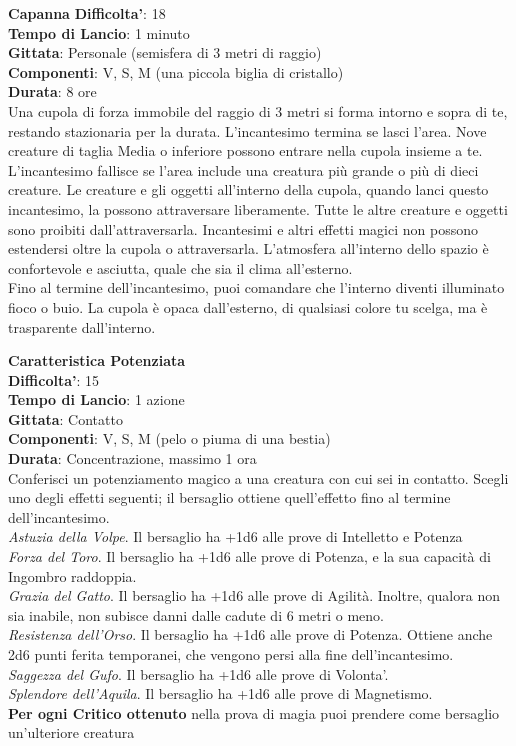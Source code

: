 \begin{multicols}{2}
\medskip\textbf{Capanna}
\textbf{Difficolta'}: 18\\
\textbf{Tempo di Lancio}: 1 minuto\\
\textbf{Gittata}: Personale (semisfera di 3 metri di raggio)\\
\textbf{Componenti}: V, S, M (una piccola biglia di cristallo)\\
\textbf{Durata}: 8 ore\\
Una cupola di forza immobile del raggio di 3 metri si forma intorno e sopra di te, restando stazionaria per la durata. L’incantesimo termina se lasci l’area. Nove creature di taglia Media o inferiore possono entrare nella cupola insieme a te. L’incantesimo fallisce se l’area include una creatura più grande o più di dieci creature. Le creature e gli oggetti all’interno della cupola, quando lanci questo incantesimo, la possono attraversare liberamente. Tutte le altre creature e oggetti sono proibiti dall’attraversarla. Incantesimi e altri effetti magici non possono estendersi oltre la cupola o attraversarla. L’atmosfera all’interno dello spazio è confortevole e asciutta, quale che sia il clima all’esterno.\\
Fino al termine dell’incantesimo, puoi comandare che l’interno diventi illuminato fioco o buio. La cupola è opaca dall’esterno, di qualsiasi colore tu scelga, ma è trasparente dall’interno. 


\medskip\textbf{Caratteristica Potenziata}\\
\textbf{Difficolta'}: 15\\
\textbf{Tempo di Lancio}: 1 azione\\
\textbf{Gittata}: Contatto\\
\textbf{Componenti}: V, S, M (pelo o piuma di una bestia)\\
\textbf{Durata}: Concentrazione, massimo 1 ora\\
Conferisci un potenziamento magico a una creatura con cui sei in contatto. Scegli uno degli effetti seguenti; il bersaglio ottiene quell’effetto fino al termine dell’incantesimo.\\
\textit{Astuzia della Volpe}. Il bersaglio ha +1d6 alle prove di Intelletto e Potenza\\
\textit{Forza del Toro}. Il bersaglio ha +1d6 alle prove di Potenza, e la sua capacità di Ingombro raddoppia.\\
\textit{Grazia del Gatto}. Il bersaglio ha +1d6 alle prove di Agilità. Inoltre, qualora non sia inabile, non subisce danni dalle cadute di 6 metri o meno.\\
\textit{Resistenza dell’Orso}. Il bersaglio ha +1d6 alle prove di Potenza. Ottiene anche 2d6 punti ferita temporanei, che vengono persi alla fine dell’incantesimo.\\
\textit{Saggezza del Gufo}. Il bersaglio ha +1d6 alle prove di Volonta'. \\
\textit{Splendore dell’Aquila}. Il bersaglio ha +1d6 alle prove di Magnetismo.\\
\textbf{Per ogni Critico ottenuto} nella prova di magia puoi prendere come bersaglio un’ulteriore creatura


\end{multicols}
